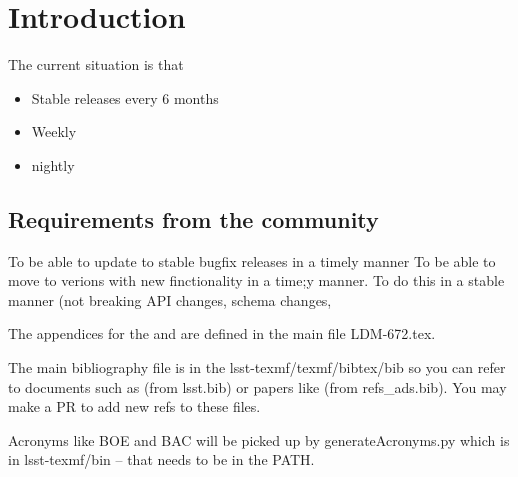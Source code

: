 \section{Introduction} \label{sec:intro}

The current situation is  that 
\begin{itemize}
\item Stable releases every 6 months 
\item Weekly 
\item nightly 
\end{itemize}


\subsection{Requirements from the community }

To be able to update to stable bugfix releases in a timely manner 
To be able to move to verions with new finctionality in a time;y manner. 
To do this in a stable manner (not breaking API changes, schema changes, 
	

The appendices for the  and  are defined in the main file LDM-672.tex.

The main bibliography file is in the lsst-texmf/texmf/bibtex/bib so you can refer to documents such as  (from lsst.bib)  or papers like \cite{2008arXiv0805.2366I} (from refs\_ads.bib). You may make a PR to add new refs to these files.

Acronyms like BOE and BAC will be picked up by generateAcronyms.py which is in lsst-texmf/bin -- that needs to be in the PATH.
